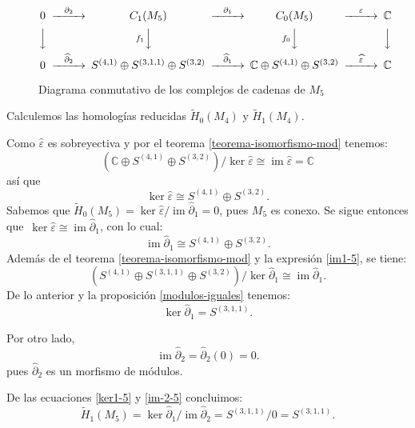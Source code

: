 \documentclass[12pt]{book}
\theoremstyle{definition}
\DeclareMathOperator{\im}{im}
\newcounter{in}
\begin{document}
\begin{figure}[h]
  \centering
    \[
    \begin{CD}
      0 @>{\partial_{2}}>> C_{1}(M_{5}) @>{\partial_{1}}>> C_{0}(M_{5}) @>{\varepsilon}>> \mathbb{C}\\
      @VVV   @Vf_{1} VV   @Vf_{0} VV   @VVV    \\
      0 @>{\widehat\partial_{2}}>> S^{(4,1)}\oplus S^{(3,1,1)}\oplus
      S^{(3,2)} @>{\widehat\partial_{1}}>> \mathbb{C}\oplus S^{(4,1)}
      \oplus S^{(3,2)} @>{\widehat \varepsilon}>> \mathbb{C}
    \end{CD}
    \]

    \caption{Diagrama conmutativo de los complejos de cadenas de
      $M_{5}$}
\label{fig:diagrama-conmutativo5}
\end{figure}

Calculemos las homologías reducidas $\widetilde H_{0}(M_{4})$ y
$\widetilde H_{1}(M_{4})$.

Como $\widehat\varepsilon$ es sobreyectiva y por el teorema \ref{teorema-isomorfismo-mod} tenemos:
$$(\mathbb{C}\oplus S^{(4,1)} \oplus
S^{(3,2)})/\ker\widehat\varepsilon\cong\im\widehat\varepsilon=\mathbb{C}$$
así que
\begin{equation*}
  \label{ker0-5}
  \ker\widehat\varepsilon\cong S^{(4,1)} \oplus S^{(3,2)}.
\end{equation*}
Sabemos que $\widetilde H_{0}(M_{5})=\ker \widehat\varepsilon/\im
\widehat\partial_{1}=0$, pues $M_{5}$  es
conexo. Se sigue entonces que~$\ker \widehat\varepsilon\cong
\im\widehat\partial_{1}$, con lo cual:
\begin{equation}
  \label{im1-5}
  \im \widehat\partial_{1}\cong S^{(4,1)} \oplus S^{(3,2)}.
\end{equation}
Además de el teorema \ref{teorema-isomorfismo-mod} y la expresión \ref{im1-5}, se tiene:
$$(S^{(4,1)}\oplus S^{(3,1,1)}\oplus S^{(3,2)})/\ker
\widehat\partial_{1}\cong \im \widehat\partial_{1}.$$
De lo anterior y la proposición \ref{modulos-iguales} tenemos:
\begin{equation}
  \label{ker1-5}
  \ker \widehat\partial_{1}= S^{(3,1,1)}.
\end{equation}

Por otro lado,
\begin{equation}
  \im\widehat\partial_{2}=\widehat\partial_{2}(0)=0.
  \label{im-2-5}
\end{equation}
pues $\widehat\partial_{2}$ es un morfismo de módulos.

De las ecuaciones \ref{ker1-5} y \ref{im-2-5} concluimos:
\begin{equation*}
  \widetilde H_{1}(M_{5})=\ker \widehat\partial_{1}/\im \widehat\partial_{2}=S^{(3,1,1)}/0=S^{(3,1,1)}.
\end{equation*}
 
\end{document}
